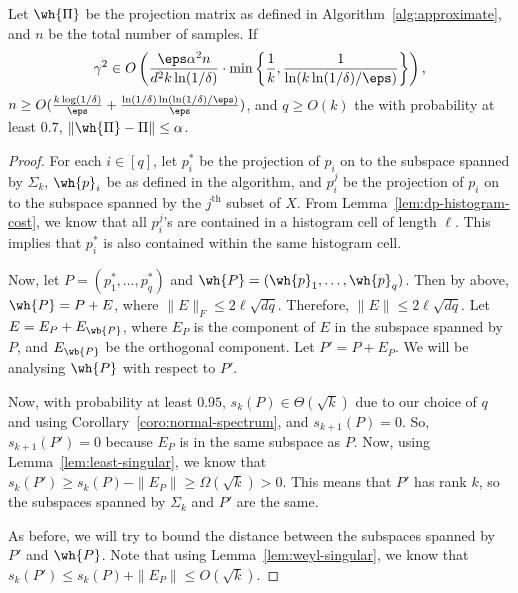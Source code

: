 \begin{lemma}\label{lem:final-projection}
    Let $\wh{\Pi}$ be the projection matrix as defined in
    Algorithm~\ref{alg:approximate}, and $n$ be the total
    number of samples. If
    $$\gamma^2 \in
        O\left(\frac{\eps\alpha^2n}{d^{2}k\ln(1/\delta)}\cdot
        \min\left\{\frac{1}{k},
        \frac{1}{\ln(k\ln(1/\delta)/\eps)}
        \right\}\right),$$
    $n \geq O(\frac{k\log(1/\delta)}{\eps}+\frac{\ln(1/\delta)\ln(\ln(1/\delta)/\eps)}{\eps})$,
    and $q \geq O(k)$
    the with probability at least $0.7$, $\|\wh{\Pi}-\Pi\| \leq \alpha$.
\end{lemma}
\begin{proof}
    For each $i \in [q]$, let $p_i^*$ be the projection
    of $p_i$ on to the subspace spanned by $\Sigma_k$,
    $\wh{p}_i$ be as defined in the algorithm, and $p_i^j$
    be the projection of $p_i$ on to the subspace spanned
    by the $j^{\mathrm{th}}$ subset of $X$. From Lemma~\ref{lem:dp-histogram-cost},
    we know that all $p_i^j$'s are contained in a histogram
    cell of length $\ell$. This implies that $p_i^*$ is also
    contained within the same histogram cell.

    Now, let $P=(p_1^*,\dots,p_q^*)$ and $\wh{P}=(\wh{p}_1,\dots,\wh{p}_q)$.
    Then by above, $\wh{P}=P+E$, where $\|E\|_F \leq 2\ell\sqrt{dq}$. Therefore,
    $\|E\| \leq 2\ell\sqrt{dq}$. Let $E=E_P+E_{\wb{P}}$,
    where $E_P$ is the component of $E$ in the subspace
    spanned by $P$, and $E_{\wb{P}}$ be the orthogonal
    component. Let $P' = P + E_P$. We will be analysing
    $\wh{P}$ with respect to $P'$.

    Now, with probability
    at least $0.95$, $s_k(P) \in \Theta(\sqrt{k})$ due to our
    choice of $q$ and using Corollary~\ref{coro:normal-spectrum},
    and $s_{k+1}(P) = 0$. So, $s_{k+1}(P') = 0$ because $E_P$ is
    in the same subspace as $P$. Now, using Lemma~\ref{lem:least-singular},
    we know that $s_k(P') \geq s_k(P) - \|E_P\| \geq \Omega(\sqrt{k}) > 0$.
    This means that
    $P'$ has rank $k$, so the subspaces spanned by $\Sigma_k$
    and $P'$ are the same.

    As before, we will try to
    bound the distance between the subspaces spanned
    by $P'$ and $\wh{P}$. Note that using Lemma~\ref{lem:weyl-singular},
    we know that $s_k(P') \leq s_k(P) + \|E_P\| \leq O(\sqrt{k})$.


\end{proof}
